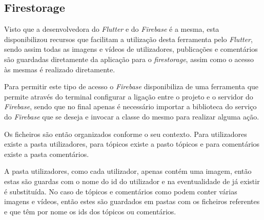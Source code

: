 \subsection{Firestorage}

Visto que a desenvolvedora do \textit{Flutter} e do \textit{Firebase} é a mesma, esta disponibilizou recursos que facilitam a utilização desta ferramenta pelo \textit{Flutter}, sendo assim todas as imagens e vídeos de utilizadores, publicações e comentários são guardadas diretamente da aplicação para o \textit{firestorage}, assim como o acesso às mesmas é realizado diretamente.

Para permitir este tipo de acesso o \textit{Firebase} disponibiliza de uma ferramenta que permite através do terminal configurar a ligação entre o projeto e o servidor do \textit{Firebase}, sendo que no final apenas é necessário importar a biblioteca do serviço do \textit{Firebase} que se deseja e invocar a classe do mesmo para realizar alguma ação.

Os ficheiros são então organizados conforme o seu contexto. Para utilizadores existe a pasta utilizadores, para tópicos existe a pasto tópicos e para comentários existe a pasta comentários. 


A pasta utilizadores, como cada utilizador, apenas contém uma imagem, então estas são guardas com o nome do id do utilizador e na eventualidade de já existir é substituída. No caso de tópicos e comentários como podem conter várias imagens e vídeos, então estes são guardados em pastas com os ficheiros referentes e que têm por nome os ids dos tópicos ou comentários.

\begin{figure}[htb]%
  \centering
  \qquad
  \label{fig:76}%
\end{figure}